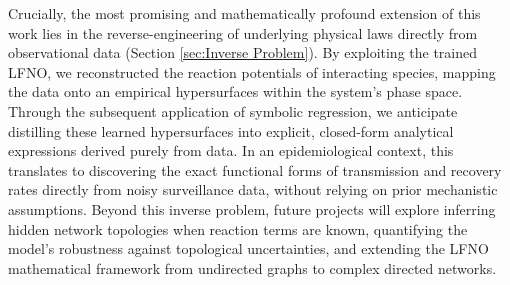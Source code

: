 Crucially, the most promising and mathematically profound extension of this work lies in the reverse-engineering of underlying physical laws directly from observational data (Section \ref{sec:Inverse Problem}). By exploiting the trained LFNO, we reconstructed the reaction potentials of interacting species, mapping the data onto an empirical hypersurfaces within the system's phase space. Through the subsequent application of symbolic regression, we anticipate distilling these learned hypersurfaces into explicit, closed-form analytical expressions derived purely from data. In an epidemiological context, this translates to discovering the exact functional forms of transmission and recovery rates directly from noisy surveillance data, without relying on prior mechanistic assumptions. Beyond this inverse problem, future projects will explore inferring hidden network topologies when reaction terms are known, quantifying the model's robustness against topological uncertainties, and extending the LFNO mathematical framework from undirected graphs to complex directed networks.